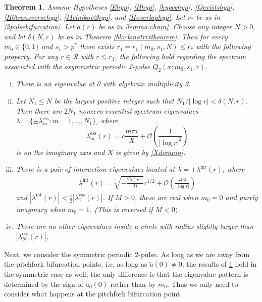 \documentclass[11pt,reqno]{amsart}
\theoremstyle{plain}
\newtheorem{theorem}{Theorem}
\theoremstyle{definition}
\theoremstyle{remark}
\begin{document}
\begin{theorem}\label{theorem:2peigsassym}
Assume Hypotheses \ref{Ehyp}, \ref{Hhyp}, \ref{hypeqhyp}, \ref{Qexistshyp}, \ref{H0transversehyp}, \ref{Melnikov2hyp}, and \ref{Hoverlaphyp}. Let $r_*$ be as in \cref{2pulsebifurcation}. Let $\tilde{a}(r)$ be as in \cref{lemma:chara}. Choose any integer $N > 0$, and let $\delta(N,r)$ be as in Theorem \ref{blockmatrixtheorem}. Then for every $m_0 \in \{0, 1\}$ and $s_1 > p^*$ there exists $r_1 = r_1(m_0, s_1, N) \leq r_*$ with the following property. For any $r \in \mathcal{R}$ with $r \leq r_1$, the following hold regarding the spectrum associated with the asymmetric periodic 2-pulse $Q_2(x; m_0, s_1, r)$.

\begin{enumerate}[(i)]
\item There is an eigenvalue at 0 with algebraic multiplicity 3. 
\item Let $N_1 \leq N$ be the largest positive integer such that $N_1/|\log r| < \delta(N,r)$. Then there are $2N_1$ nonzero essential spectrum eigenvalues $\lambda = \{ \pm \lambda_m^{\text{ess}} : m = 1, \dots, N_1 \}$, where
\[
\lambda_m^{\text{ess}}(r) = c \frac{m \pi i}{X}+  \mathcal{O}\left( \frac{1}{|\log r|^2} \right)
\]
is on the imaginary axis and $X$ is given by \cref{Xdomain}.

\item There is a pair of interaction eigenvalues located at $\lambda = \pm \lambda^{\text{int}}(r)$, where
	\begin{align*}
	\lambda^{\text{int}}(r) =  \sqrt{-\frac{2 \tilde{a}(r)}{M}}r^{1/2} + \mathcal{O}\left( \frac{r^{1/2}}{|\log r|} \right) 
	\end{align*}
and $|\lambda^{\text{int}}(r)| < \frac{1}{2}|\lambda_1^{\text{ess}}(r)|$. If $M > 0$, these are real when $m_0 = 0$ and purely imaginary when $m_0 = 1$. (This is reversed if $M < 0)$. 
\item There are no other eigenvalues inside a circle with radius slightly larger than $|\lambda_{N_1}^{\text{ess}}(r)|$.
\end{enumerate}
\end{theorem}

Next, we consider the symmetric periodic 2-pulse. As long as we are away from the pitchfork bifurcation points, i.e. as long as $\tilde{a}(0) \neq 0$, the results of \cref{theorem:2peigsassym} hold in the symmetric case as well; the only difference is that the eigenvalue pattern is determined by the sign of $\tilde{a}_0(0)$ rather than by $m_0$. Thus we only need to consider what happens at the pitchfork bifurcation point.
\end{document}
